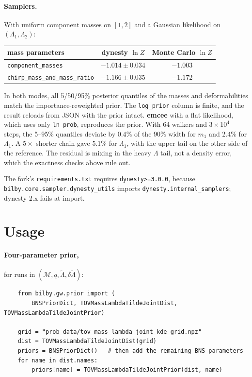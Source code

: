 \documentclass[11pt,a4paper]{article}
\newcommand{\Mc}{\mathcal{M}}
\newcommand{\lt}{\tilde{\Lambda}}
\newcommand{\dlt}{\delta\tilde{\Lambda}}
\newcommand{\code}[1]{\texttt{#1}}
\begin{document}
\paragraph{Samplers.}
With uniform component masses on $[1, 2]$ and a Gaussian likelihood on
$(\Lambda_1, \Lambda_2)$:
\begin{center}
\begin{tabular}{lcc}
\toprule
mass parameters & dynesty $\ln Z$ & Monte Carlo $\ln Z$ \\
\midrule
\code{component\_masses} & $-1.014 \pm 0.034$ & $-1.003$ \\
\code{chirp\_mass\_and\_mass\_ratio} & $-1.166 \pm 0.035$ & $-1.172$ \\
\bottomrule
\end{tabular}
\end{center}
In both modes, all 5/50/95\% posterior quantiles of the masses and
deformabilities match the importance-reweighted prior. The \code{log\_prior}
column is finite, and the result reloads from JSON with the prior intact.
\textbf{emcee} with a flat likelihood, which uses only \code{ln\_prob},
reproduces the prior. With 64 walkers and $3\times10^4$ steps, the
5--95\% quantiles deviate by $0.4\%$ of the 90\% width for $m_1$ and $2.4\%$ for
$\Lambda_1$. A $5\times$ shorter chain gave $5.1\%$ for $\Lambda_1$, with the
upper tail on the other side of the reference. The residual is mixing in the
heavy $\Lambda$ tail, not a density error, which the exactness checks above
rule out.

The fork's \code{requirements.txt} requires \code{dynesty>=3.0.0}, because
\code{bilby.core.sampler.dynesty\_utils} imports \code{dynesty.internal\_samplers};
dynesty 2.x fails at import.

\section{Usage}

\paragraph{Four-parameter prior,} for runs in $(\Mc, q, \lt, \dlt)$:
\begin{verbatim}
    from bilby.gw.prior import (
        BNSPriorDict, TOVMassLambdaTildeJointDist, TOVMassLambdaTildeJointPrior)

    grid = "prob_data/tov_mass_lambda_joint_kde_grid.npz"
    dist = TOVMassLambdaTildeJointDist(grid)
    priors = BNSPriorDict()   # then add the remaining BNS parameters
    for name in dist.names:
        priors[name] = TOVMassLambdaTildeJointPrior(dist, name)
\end{verbatim}
\end{document}
